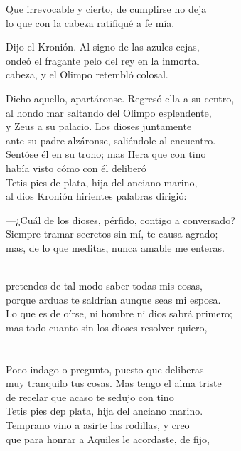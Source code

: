 Que irrevocable y cierto, de cumplirse no deja\\
lo que con la cabeza ratifiqué a fe mía.\par
Dijo el Kronión. Al signo de las azules cejas,\\
ondeó el fragante pelo del rey en la inmortal\\
cabeza, y el Olimpo retembló colosal.\par
Dicho aquello, apartáronse. Regresó ella a su centro,\\
al hondo mar saltando del Olimpo esplendente,\\
y Zeus a su palacio. Los dioses juntamente\\
ante su padre alzáronse, saliéndole al encuentro.\\
Sentóse él en su trono; mas Hera que con tino\\
había visto cómo con él deliberó\\
Tetis pies de plata, hija del anciano marino,\\
al dios Kronión hirientes palabras dirigió:\par
---¿Cuál de los dioses, pérfido, contigo a conversado?\\
Siempre tramar secretos sin mí, te causa agrado;\\
mas, de lo que meditas, nunca amable me enteras.\par
{}\\
pretendes de tal modo saber todas mis cosas,\\
porque arduas te saldrían aunque seas mi esposa.\\
Lo que es de oírse, ni hombre ni dios sabrá primero;\\
mas todo cuanto sin los dioses resolver quiero,\\
\\
\\
Poco indago o pregunto, puesto que deliberas\\
muy tranquilo tus cosas. Mas tengo el alma triste\\
de recelar que acaso te sedujo con tino\\
Tetis pies dep plata, hija del anciano marino.\\
Temprano vino a asirte las rodillas, y creo\\
que para honrar a Aquiles le acordaste, de fijo,\\
